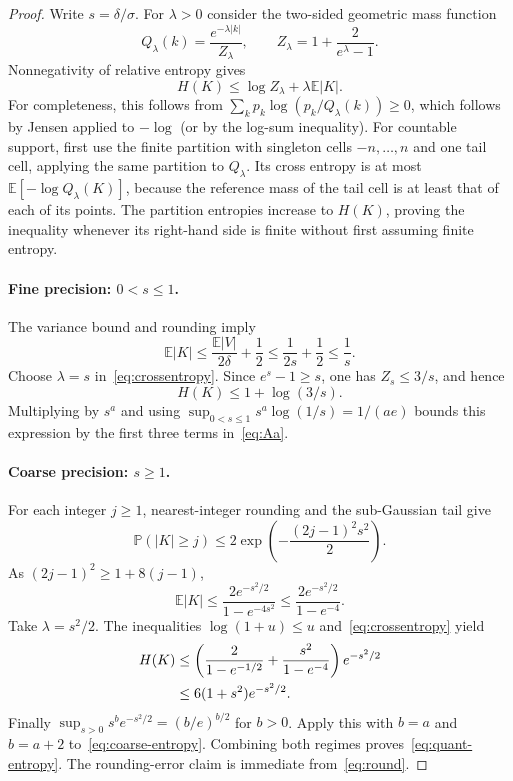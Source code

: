 \documentclass[11pt,a4paper]{article}
\newcommand{\E}{\mathbb E}
\newcommand{\PP}{\mathbb P}
\theoremstyle{definition}
\theoremstyle{remark}
\begin{document}
\begin{proof}
Write $s=\delta/\sigma$. For $\lambda>0$ consider the two-sided geometric mass function
\[
 Q_\lambda(k)=\frac{e^{-\lambda|k|}}{Z_\lambda},\qquad
 Z_\lambda=1+\frac{2}{e^\lambda-1}.
\]
Nonnegativity of relative entropy gives
\begin{equation}\label{eq:crossentropy}
 H(K)\le\log Z_\lambda+\lambda\E|K|.
\end{equation}
For completeness, this follows from
$\sum_k p_k\log(p_k/Q_\lambda(k))\ge0$, which follows by Jensen applied to $-\log$ (or by the log-sum inequality). For countable support, first use the finite partition with singleton cells $-n,\ldots,n$ and one tail cell, applying the same partition to $Q_\lambda$. Its cross entropy is at most $\E[-\log Q_\lambda(K)]$, because the reference mass of the tail cell is at least that of each of its points. The partition entropies increase to $H(K)$, proving the inequality whenever its right-hand side is finite without first assuming finite entropy.

\paragraph{Fine precision: $0<s\le1$.} The variance bound and rounding imply
\[
 \E|K|\le\frac{\E|V|}{2\delta}+\frac12
 \le\frac{1}{2s}+\frac12\le\frac1s.
\]
Choose $\lambda=s$ in~\eqref{eq:crossentropy}. Since $e^s-1\ge s$, one has $Z_s\le3/s$, and hence
\begin{equation}\label{eq:fine-entropy}
 H(K)\le1+\log(3/s).
\end{equation}
Multiplying by $s^a$ and using $\sup_{0<s\le1}s^a\log(1/s)=1/(ae)$ bounds this expression by the first three terms in~\eqref{eq:Aa}.

\paragraph{Coarse precision: $s\ge1$.} For each integer $j\ge1$, nearest-integer rounding and the sub-Gaussian tail give
\[
 \PP(|K|\ge j)\le 2\exp\left(-\frac{(2j-1)^2s^2}{2}\right).
\]
As $(2j-1)^2\ge1+8(j-1)$,
\[
 \E|K|\le\frac{2e^{-s^2/2}}{1-e^{-4s^2}}
 \le\frac{2e^{-s^2/2}}{1-e^{-4}}.
\]
Take $\lambda=s^2/2$. The inequalities $\log(1+u)\le u$ and~\eqref{eq:crossentropy} yield
\begin{align}
 H(K)
 &\le\left(\frac{2}{1-e^{-1/2}}+\frac{s^2}{1-e^{-4}}\right)e^{-s^2/2}\notag\\
 &\le6(1+s^2)e^{-s^2/2}.\label{eq:coarse-entropy}
\end{align}
Finally $\sup_{s>0}s^b e^{-s^2/2}=(b/e)^{b/2}$ for $b>0$. Apply this with $b=a$ and $b=a+2$ to~\eqref{eq:coarse-entropy}. Combining both regimes proves~\eqref{eq:quant-entropy}. The rounding-error claim is immediate from~\eqref{eq:round}.
\end{proof}
\end{document}
